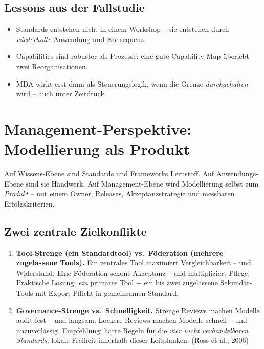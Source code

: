 \documentclass[11pt,a4paper,oneside]{article}
\newcommand{\quelle}[1]{{\footnotesize\color{lpGray}(#1)}}
\begin{document}
\subsection{Lessons aus der Fallstudie}

\begin{itemize}
  \item Standards entstehen nicht in einem Workshop -- sie entstehen durch \emph{wiederholte} Anwendung und Konsequenz.
  \item Capabilities sind robuster als Prozesse: eine gute Capability Map überlebt zwei Reorganisationen.
  \item MDA wirkt erst dann als Steuerungslogik, wenn die Grenze \emph{durchgehalten} wird -- auch unter Zeitdruck.
\end{itemize}

\section{Management-Perspektive: Modellierung als Produkt}

Auf Wissens-Ebene sind Standards und Frameworks Lernstoff. Auf Anwendungs-Ebene sind sie Handwerk. Auf Management-Ebene wird Modellierung selbst zum \emph{Produkt} -- mit einem Owner, Releases, Akzeptanzstrategie und messbaren Erfolgskriterien.

\subsection{Zwei zentrale Zielkonflikte}

\begin{enumerate}
  \item \textbf{Tool-Strenge (ein Standardtool) vs.\ Föderation (mehrere zugelassene Tools).} Ein zentrales Tool maximiert Vergleichbarkeit -- und Widerstand. Eine Föderation schont Akzeptanz -- und multipliziert Pflege. Praktische Lösung: \emph{ein} primäres Tool + ein bis zwei zugelassene Sekundär-Tools mit Export-Pflicht in gemeinsamen Standard.
  \item \textbf{Governance-Strenge vs.\ Schnelligkeit.} Strenge Reviews machen Modelle audit-fest -- und langsam. Lockere Reviews machen Modelle schnell -- und unzuverlässig. Empfehlung: harte Regeln für die \emph{vier nicht verhandelbaren Standards}, lokale Freiheit innerhalb dieser Leitplanken. \quelle{Ross et al., 2006}
\end{enumerate}
\end{document}
